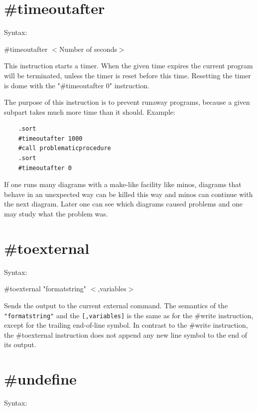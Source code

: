  
\section{\#timeoutafter}
\label{pretimeoutafter}

\noindent Syntax:

\#timeoutafter $<$Number of seconds$>$
 
\noindent This instruction starts a timer. When the given time expires the 
current program will be terminated, unless the timer is reset before this 
time. Resetting the timer is dome with the "\#timeoutafter 0" instruction.

The purpose of this instruction is to prevent runaway programs, because a 
given subpart takes much more time than it should. Example:
\begin{verbatim}
    .sort
	#timeoutafter 1000
	#call problematicprocedure
	.sort
	#timeoutafter 0
\end{verbatim}
If one runs many diagrams with a make-like facility like minos, diagrams 
that behave in an unexpected way can be killed this way and minos can 
continue with the next diagram. Later one can see which diagrams caused 
problems and one may study what the problem was.


\section{\#toexternal}
\label{pretoexternal}

\noindent Syntax:

\#toexternal "formatstring" $<$,variables$>$

\noindent Sends the output to the current external 
command. The semantics of the \verb|"formatstring"| and the
\verb|[,variables]| is the same as for the \#write 
instruction, except for the trailing end-of-line symbol. In contrast to the 
\#write instruction, the \#toexternal instruction does not append any new 
line symbol to the end of its output.


\section{\#undefine}
\label{preundefine}

\noindent Syntax:

